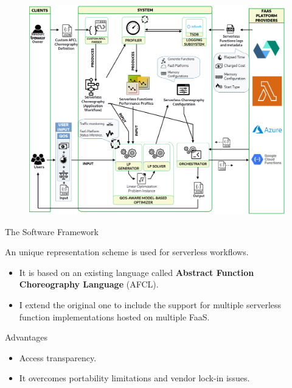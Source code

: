 \documentclass[13.5pt]{beamer}
\newcommand{\B}[1]{\textcolor{TorVergataColor}{\textbf{#1}}}
\begin{document}
\begin{frame}

\begin{figure}[h]
	\centering
	\includegraphics[width=\textwidth]{../Images/SystemForSlide.png}
\end{figure}


\end{frame} 
\begin{frame}{The Software Framework}
	
	\begin{block}{}
		\centering
		An unique representation scheme is used for serverless workflows.
	\end{block}

	\vspace{\baselineskip}
	
	\begin{itemize}
		\item It is based on an existing language called \B{Abstract Function Choreography Language} (AFCL).
		\item I extend the original one to include the support for multiple serverless function implementations hosted on multiple FaaS.
	\end{itemize}

	\vspace{\baselineskip}
	
	\begin{block}{Advantages}
	\centering
	\begin{itemize}
		\item Access transparency.
		\item It overcomes portability limitations and vendor lock-in issues.
	\end{itemize}
	\end{block}
	

\end{frame} 
\end{document}
